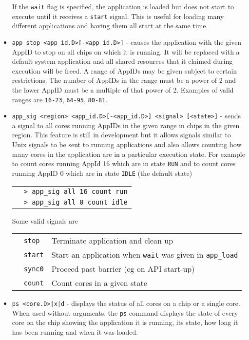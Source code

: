 \begin{itemize}
If the \texttt{wait} flag is specified, the application is loaded
but does not start to execute until it receives a \texttt{start}
signal. This is useful for loading many different applications
and having them all start at the same time.

\item
\texttt{app\_stop <app\_id.D>[-<app\_id.D>]} - causes the application
with the given AppID to stop on all chips on which it is running. It
will be replaced with a default system application and all shared
resources that it claimed during execution will be freed. A range of
AppIDs may be given subject to certain restrictions. The number of
AppIDs in the range must be a power of 2 and the lower AppID must
be a multiple of that power of 2. Examples of valid ranges are
\texttt{16-23}, \texttt{64-95}, \texttt{80-81}.

\item
\texttt{app\_sig <region> <app\_id.D>[-<app\_id.D>] <signal>
[<state>]} - sends a signal to all cores running AppIDs in the given
range in chips in the given region. This feature is still in
development but it allows signals similar to Unix signals to be sent
to running applications and also allows counting how many cores in the
application are in a particular execution state. For example to count
cores running AppId 16 which are in state \texttt{RUN} and to count
cores running AppID 0 which are in state \texttt{IDLE} (the default
state)

\begin{tabular}{p{1cm} p{10cm}}
& \texttt{> app\_sig all 16 count run} \\
& \texttt{> app\_sig all 0 count idle} \\
\end{tabular}

Some valid signals are

\begin{tabular}{p{0.5cm} p{2cm} p{12cm}}
& \texttt{stop} & Terminate application and clean up \\
& \texttt{start} & Start an application when \texttt{wait} was given in \texttt{app\_load} \\
& \texttt{sync0} & Proceed past barrier (eg on API start-up) \\
& \texttt{count} & Count cores in a given state \\
\end{tabular}

\item
\texttt{ps <core.D>|x|d} - displays the status of all cores on a chip or
a single core. When used without arguments, the \texttt{ps} command
displays the state of every core on the chip showing the application
it is running, its state, how long it has been running and when it was
loaded.


\end{itemize}
